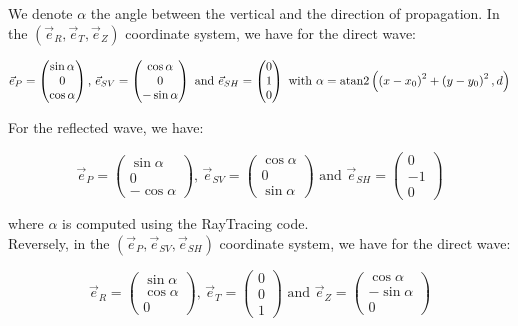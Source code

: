 \documentclass[workdone.tex]{subfiles}
\begin{document}
We denote $\alpha$ the angle between the vertical and the direction of propagation. In the $\left( \vec{e}_R, \vec{e}_T, \vec{e}_Z \right)$ coordinate system, we have for the direct wave:

\begin{equation}
\vec{e}_P = \begin{pmatrix}
\sin \alpha \\
0 \\
\cos \alpha
\end{pmatrix} \text{, } \vec{e}_{SV} = \begin{pmatrix}
\cos \alpha \\
0 \\
- \sin \alpha
\end{pmatrix} \text{ and } \vec{e}_{SH} = \begin{pmatrix}
0 \\
1 \\
0
\end{pmatrix} \text{ with } \alpha = \operatorname{atan2} \left( \left( x - x_0 \right) ^2 + \left( y - y_0 \right) ^2, d \right)
\end{equation}

For the reflected wave, we have:

\begin{equation}
\vec{e}_P = \begin{pmatrix}
\sin \alpha \\
0 \\
- \cos \alpha
\end{pmatrix} \text{, } \vec{e}_{SV} = \begin{pmatrix}
\cos \alpha \\
0 \\
\sin \alpha
\end{pmatrix} \text{ and } \vec{e}_{SH} = \begin{pmatrix}
0 \\
- 1 \\
0
\end{pmatrix}
\end{equation}

where $\alpha$ is computed using the RayTracing code. \\

Reversely, in the $\left( \vec{e}_P, \vec{e}_{SV}, \vec{e}_{SH} \right)$ coordinate system, we have for the direct wave:

\begin{equation}
\vec{e}_R = \begin{pmatrix}
\sin \alpha \\
\cos \alpha \\
0
\end{pmatrix} \text{, } \vec{e}_T = \begin{pmatrix}
0 \\
0 \\
1
\end{pmatrix} \text{ and } \vec{e}_Z = \begin{pmatrix}
\cos \alpha \\
- \sin \alpha \\
0
\end{pmatrix}
\end{equation}
\end{document}
